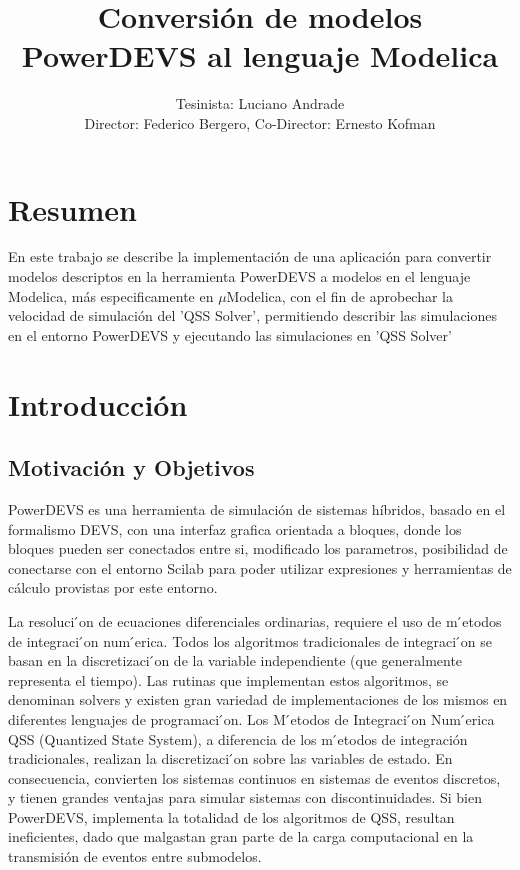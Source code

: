 \documentclass[a4paper,	11pt]{article}
\begin{document}
\renewcommand\floatpagefraction{.9}
\renewcommand\topfraction{.9}
\renewcommand\bottomfraction{.9}
\renewcommand\textfraction{.1}
\setcounter{totalnumber}{50}
\setcounter{topnumber}{50}
\setcounter{bottomnumber}{50}

\title{Conversión de modelos PowerDEVS al lenguaje Modelica}
\author{Tesinista: Luciano Andrade \\ Director: Federico Bergero, Co-Director: Ernesto Kofman} 

\maketitle
\section{Resumen}
En este trabajo se describe la implementación de una aplicación para convertir modelos descriptos en la herramienta PowerDEVS a modelos en el lenguaje Modelica, más especificamente en $\mu$Modelica, con el fin de aprobechar la velocidad de simulación del 'QSS Solver', permitiendo describir las simulaciones en el entorno PowerDEVS y ejecutando las simulaciones en 'QSS Solver'


\section{Introducción}
\subsection{Motivación y Objetivos}
PowerDEVS es una herramienta de simulación de sistemas híbridos, basado en el formalismo DEVS, con una interfaz grafica orientada a bloques, donde los bloques pueden ser conectados entre si, modificado los parametros, posibilidad de conectarse con el entorno Scilab para poder utilizar expresiones y herramientas de cálculo provistas por este entorno.

La resoluci ́on de ecuaciones diferenciales ordinarias, requiere el uso de m ́etodos de integraci ́on num ́erica. Todos los algoritmos tradicionales de integraci ́on se basan en la discretizaci ́on de la variable independiente (que generalmente representa el tiempo). Las rutinas que implementan estos algoritmos, se denominan solvers y existen gran variedad de implementaciones de los mismos en diferentes lenguajes de programaci ́on. Los M ́etodos de Integraci ́on Num ́erica QSS (Quantized State System), a diferencia de los m ́etodos de integración tradicionales, realizan la discretizaci ́on sobre las variables de estado. En consecuencia, convierten los sistemas continuos en sistemas de eventos discretos, y tienen grandes ventajas para simular sistemas con discontinuidades.
Si bien PowerDEVS, implementa la totalidad de los algoritmos de QSS, resultan ineficientes, dado que malgastan gran parte de la carga computacional en la transmisión de eventos entre submodelos.
\end{document}
